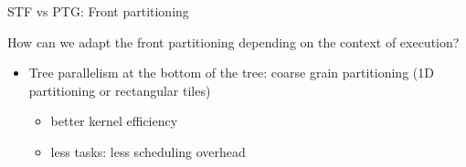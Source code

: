\documentclass{beamer}
\newcommand{\dg}[1]{\textcolor{amgreen}{#1}}
\newcommand{\db}[1]{\textcolor{amblu}{#1}}
\begin{document}
\begin{frame}{STF vs PTG: Front partitioning}


  How can we adapt the front partitioning depending on the context of
  execution?
  
  \begin{itemize}
  \item \db{Tree parallelism} at the \alert{bottom of the tree}: coarse
    grain partitioning (1D partitioning or rectangular tiles) 
    \begin{itemize}
    \item better kernel efficiency
    \item less tasks: less scheduling overhead
    \end{itemize}
    
  \end{itemize}      

  \begin{center}
  \end{center}

\end{frame}
\end{document}
